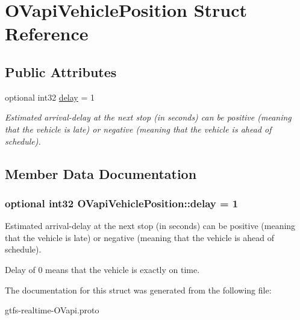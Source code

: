 \hypertarget{structOVapiVehiclePosition}{}\section{O\+Vapi\+Vehicle\+Position Struct Reference}
\label{structOVapiVehiclePosition}
\subsection*{Public Attributes}
\begin{DoxyCompactItemize}
\item 
optional int32 \hyperlink{structOVapiVehiclePosition_a5b00e6d0281e09ac99206417aee6e979}{delay} = 1
\begin{DoxyCompactList}\small\item\em Estimated arrival-\/delay at the next stop (in seconds) can be positive (meaning that the vehicle is late) or negative (meaning that the vehicle is ahead of schedule). \end{DoxyCompactList}\end{DoxyCompactItemize}


\subsection{Member Data Documentation}
\subsubsection[{\texorpdfstring{delay}{delay}}]{\setlength{\rightskip}{0pt plus 5cm}optional int32 O\+Vapi\+Vehicle\+Position\+::delay = 1}\hypertarget{structOVapiVehiclePosition_a5b00e6d0281e09ac99206417aee6e979}{}\label{structOVapiVehiclePosition_a5b00e6d0281e09ac99206417aee6e979}


Estimated arrival-\/delay at the next stop (in seconds) can be positive (meaning that the vehicle is late) or negative (meaning that the vehicle is ahead of schedule). 

Delay of 0 means that the vehicle is exactly on time. 

The documentation for this struct was generated from the following file\+:\begin{DoxyCompactItemize}
\item 
gtfs-\/realtime-\/\+O\+Vapi.\+proto\end{DoxyCompactItemize}
